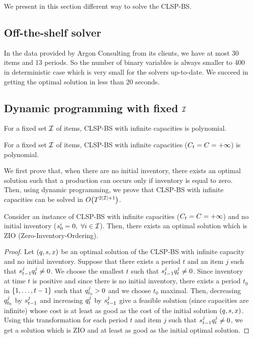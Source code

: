 We present in this section different way to solve the CLSP-BS.


\subsection{Off-the-shelf solver}


In the data provided by Argon Consulting from its clients, we have at most 30 items and 13 periods.
So the number of binary variables is always smaller to 400 in deterministic case which is very small for the solvers up-to-date.
We succeed in getting the optimal solution in less than 20 seconds.




\subsection{Dynamic programming with fixed $\mathcal{I}$}

For a fixed set $\mathcal{I}$ of items, CLSP-BS with infinite capacities is polynomial.

\begin{thm}\label{thm:complexity:fixed-number-items:infinite-capacity}
For a fixed set $\mathcal{I}$ of items, CLSP-BS with infinite capacities ($C_t=C=+\infty$) is polynomial.
\end{thm}


We first prove that, when there are no initial inventory, there exists an optimal solution such that a production can occurs only if inventory is equal to zero.
Then, using dynamic programming, we prove that CLSP-BS with infinite capacities can be solved in $O\bracket{\horizon^{2\card{\REF}+1}}$.




\begin{lem}\label{lem:complexity:fixed-number-items:infinite-capacity:ZIO}
Consider an instance of CLSP-BS with infinite capacities ($C_t=C=+\infty$) and no initial inventory ($s_0^i=0,\ \forall i\in\mathcal{I}$).
Then, there exists an optimal solution which is ZIO (Zero-Inventory-Ordering).
\end{lem}


\begin{proof}
Let $\bracket{\quantity,\inventory,\setup}$ be an optimal solution of the CLSP-BS with infinite capacity and no initial inventory.
Suppose that there exists a period $t$ and an item $j$ such that $s_{t-1}^jq_t^j\ne0$.
We choose the smallest $t$ such that $s_{t-1}^jq_t^j\ne0$.
Since inventory at time $t$ is positive and since there is no initial inventory, there exists a period $t_0$ in $\range[1]{t-1}$ such that $q_{t_0}^j>0$ and we choose $t_0$ maximal.
Then, decreasing $q_{t_0}^j$ by $s_{t-1}^j$ and increasing $q_t^j$ by $s_{t-1}^j$ give a feasible solution (since capacities are infinite) whose cost is at least as good as the cost of the initial solution $\bracket{\quantity,\inventory,\setup}$.
Using this transformation for each period $t$ and item $j$ such that $s_{t-1}^jq_t^j\ne0$, we get a solution which is ZIO and at least as good as the initial optimal solution.
\end{proof}


